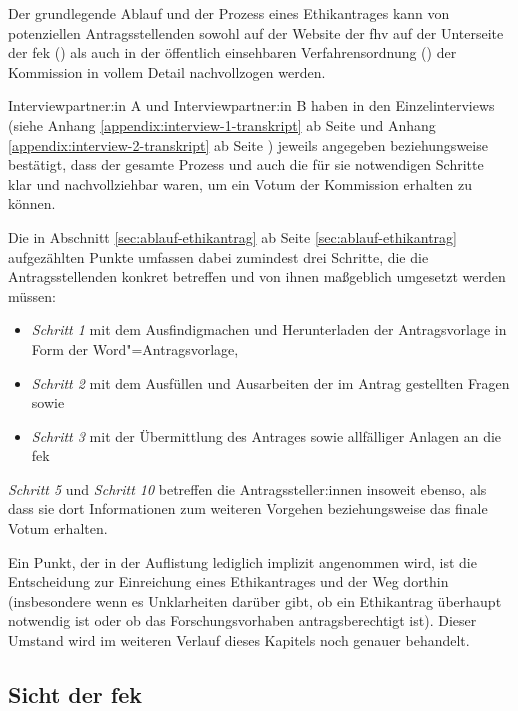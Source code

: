 \documentclass[a4paper,12pt,twoside]{scrreprt}
\begin{document}
Der grundlegende Ablauf und der Prozess eines Ethikantrages kann von potenziellen Antragsstellenden sowohl auf der Website der \ac{fhv} auf der Unterseite der \ac{fek} (\cite{fachhochschule_vorarlberg_gmbh_forschungsethik-kommission_2021}) als auch in der öffentlich einsehbaren Verfahrensordnung (\cite{forschungsethik-kommission_der_fachhochschule_vorarlberg_verfahrensordnung_2020}) der Kommission in vollem Detail nachvollzogen werden.

Interviewpartner:in A und Interviewpartner:in B haben in den Einzelinterviews (siehe Anhang \ref{appendix:interview-1-transkript} ab Seite \pageref{appendix:interview-1-transkript} und Anhang \ref{appendix:interview-2-transkript} ab Seite \pageref{appendix:interview-2-transkript}) jeweils angegeben beziehungsweise bestätigt, dass der gesamte Prozess und auch die für sie notwendigen Schritte klar und nachvollziehbar waren, um ein Votum der Kommission erhalten zu können.

\medskip

Die in Abschnitt \ref{sec:ablauf-ethikantrag} ab Seite \ref{sec:ablauf-ethikantrag} aufgezählten Punkte umfassen dabei zumindest drei Schritte, die die Antragsstellenden konkret betreffen und von ihnen maßgeblich umgesetzt werden müssen:
\begin{itemize}
    \item \textit{Schritt 1} mit dem Ausfindigmachen und Herunterladen der Antragsvorlage in Form der Word"=Antragsvorlage,
    \item \textit{Schritt 2} mit dem Ausfüllen und Ausarbeiten der im Antrag gestellten Fragen sowie
    \item \textit{Schritt 3} mit der Übermittlung des Antrages sowie allfälliger Anlagen an die \ac{fek}
\end{itemize}

\noindent\textit{Schritt 5} und \textit{Schritt 10} betreffen die Antragssteller:innen insoweit ebenso, als dass sie dort Informationen zum weiteren Vorgehen beziehungsweise das finale Votum erhalten.

Ein Punkt, der in der Auflistung lediglich implizit angenommen wird, ist die Entscheidung zur Einreichung eines Ethikantrages und der Weg dorthin (insbesondere wenn es Unklarheiten darüber gibt, ob ein Ethikantrag überhaupt notwendig ist oder ob das Forschungsvorhaben antragsberechtigt ist). Dieser Umstand wird im weiteren Verlauf dieses Kapitels noch genauer behandelt.

\subsection{Sicht der \acl{fek}}
\label{sub-sec:ablauf-sicht-fek}
\end{document}
